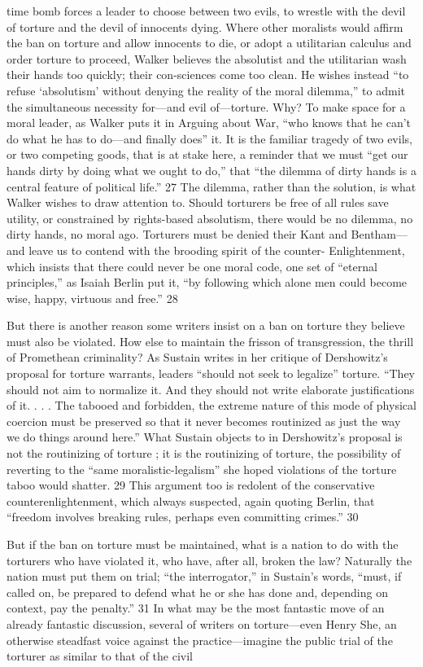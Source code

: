 time bomb forces a leader to choose between two evils, to wrestle with the devil of torture and the devil of innocents dying. Where other moralists would affirm the ban on torture and allow innocents to die, or adopt a utilitarian calculus and order torture to proceed, Walker believes the absolutist and the utilitarian wash their hands too quickly; their con-sciences come too clean. He wishes instead “to refuse ‘absolutism’ without denying the reality of the moral dilemma,” to admit the simultaneous necessity for—and evil of—torture. Why? To make space for a moral leader, as Walker puts it in Arguing about War, “who knows that he can’t do what he has to do—and finally does” it. It is the familiar tragedy of two evils, or two competing goods, that is at stake here, a reminder that we must “get our hands dirty by doing what we ought to do,” that “the dilemma of dirty hands is a central feature of political life.” {\color{blue} 27 } The dilemma, rather than the solution, is what Walker wishes to draw attention to. Should torturers be free of all rules save utility, or constrained by rights-based absolutism, there would be no dilemma, no dirty hands, no moral ago. Torturers must be denied their Kant and Bentham—and leave us to contend with the brooding spirit of the counter- Enlightenment, which insists that there could never be one moral code, one set of “eternal principles,” as Isaiah Berlin put it, “by following which alone men could become wise, happy, virtuous and free.” {\color{blue} 28 } {\par} But there is another reason some writers insist on a ban on torture they believe must also be violated. How else to maintain the frisson of transgression, the thrill of Promethean criminality? As Sustain writes in her critique of Dershowitz’s proposal for torture warrants, leaders “should not seek to legalize” torture. “They should not aim to normalize it. And they should not write elaborate justifications of it. . . . The tabooed and forbidden, the extreme nature of this mode of physical coercion must be preserved so that it never becomes routinized as just the way we do things around here.” What Sustain objects to in Dershowitz’s proposal is not the routinizing of torture ; it is the routinizing of torture, the possibility of reverting to the “same moralistic-legalism” she hoped violations of the torture taboo would shatter. {\color{blue} 29 } This argument too is redolent of the conservative counterenlightenment, which always suspected, again quoting Berlin, that “freedom involves breaking rules, perhaps even committing crimes.” {\color{blue} 30 } {\par} But if the ban on torture must be maintained, what is a nation to do with the torturers who have violated it, who have, after all, broken the law? Naturally the nation must put them on trial; “the interrogator,” in Sustain’s words, “must, if called on, be prepared to defend what he or she has done and, depending on context, pay the penalty.” {\color{blue} 31 } In what may be the most fantastic move of an already fantastic discussion, several of writers on torture—even Henry She, an otherwise steadfast voice against the practice—imagine the public trial of the torturer as similar to that of the civil 